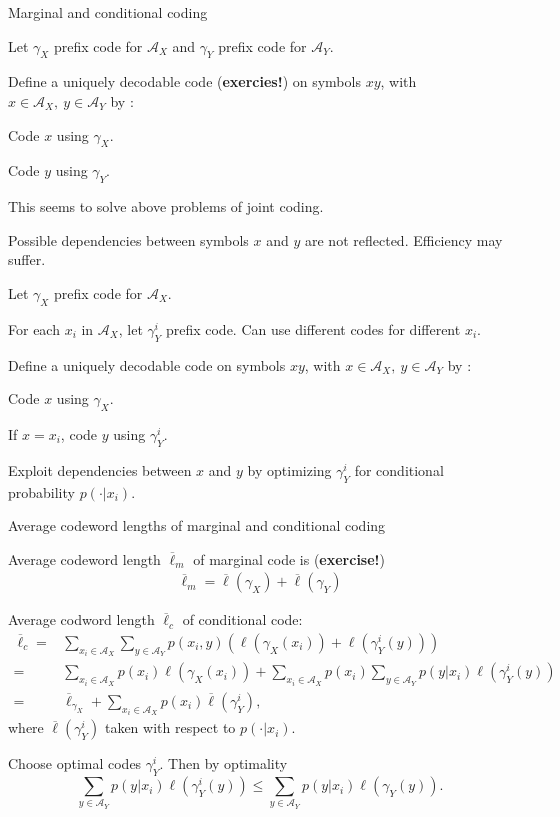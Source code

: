 \begin{frame}{Marginal and conditional coding}
\bit
\item Let $\gamma_X$ prefix code for $\mathcal{A}_X$ and $\gamma_Y$ prefix code for $\mathcal{A}_Y$. 
\item Define a uniquely decodable code (\textbf{exercies!}) on symbols $xy$, with $x\in\mathcal{A}_X, \:y\in\mathcal{A}_Y$ by :
\bit
\item Code $x$ using $\gamma_X$.
\item Code $y$ using $\gamma_Y$. 
\eit
\item This seems to solve above problems of joint coding. 
\item {} Possible dependencies between symbols $x$ and $y$ are not reflected. Efficiency may suffer. 
\eit
{} 
\bit
\item Let $\gamma_X$ prefix code for $\mathcal{A}_X$. 
\item For each $x_i$ in $\mathcal{A}_X$, let $\gamma_Y^{i}$ prefix code. Can use different codes for different $x_i$. 
\item Define a uniquely decodable code on symbols $xy$, with $x\in\mathcal{A}_X, \:y\in\mathcal{A}_Y$ by :
\bit
\item Code $x$ using $\gamma_X$.
\item If $x=x_i$, code $y$ using $\gamma_Y^i$. 
\eit
\item Exploit dependencies between $x$ and $y$ by optimizing $\gamma_Y^i$ for conditional probability $p(\cdot|x_i)$. 
\eit 
\end{frame}


\begin{frame}{Average codeword lengths of marginal and conditional coding}
\bit
\item Average codeword length $\overline{\ell}_m$ of marginal code is (\textbf{exercise!})
\begin{align}\label{CWMarg}
\overline{\ell}_m= \overline{\ell}(\gamma_X)+\overline{\ell}(\gamma_Y) 
\end{align}
\item Average codword length $\overline{\ell}_c$ of conditional code:
\begin{align}
\overline{\ell}_c=&\sum_{x_i\in\mathcal{A}_X}\sum_{y\in\mathcal{A}_Y}p(x_i,y)(\ell(\gamma_X(x_i))+\ell(\gamma_Y^i(y)))\nonumber\\
=&\sum_{x_i\in\mathcal{A}_X}p(x_i)\ell(\gamma_X(x_i))+\sum_{x_i\in\mathcal{A}_X}p(x_i)\sum_{y\in\mathcal{A}_Y}p(y|x_i)\ell(\gamma_Y^i(y))\label{EqCondL}\\
=&\overline{\ell}_{\gamma_X}+\sum_{x_i\in\mathcal{A}_X}p(x_i)\overline\ell(\gamma_Y^i)\nonumber,
\end{align}
where $\overline\ell(\gamma_Y^i)$ taken with respect to $p(\cdot|x_i)$.
\item Choose optimal codes $\gamma_Y^{i}$. Then by optimality
\[
\sum_{y\in\mathcal{A}_Y}p(y|x_i)\ell(\gamma_Y^i(y))\leq \sum_{y\in\mathcal{A}_Y}p(y|x_i)\ell(\gamma_Y(y)).
\] 
\eit
\end{frame}

